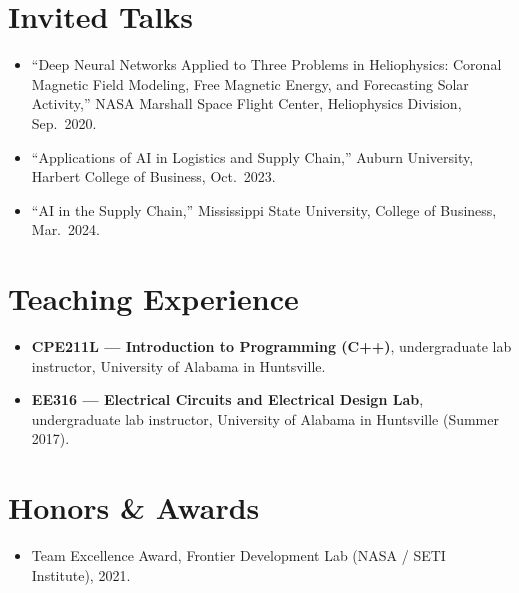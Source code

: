 \documentclass[11pt,letterpaper]{article}
\begin{document}
\section{Invited Talks}
\begin{itemize}
  \item ``Deep Neural Networks Applied to Three Problems in Heliophysics: Coronal Magnetic Field Modeling, Free Magnetic Energy, and Forecasting Solar Activity,'' NASA Marshall Space Flight Center, Heliophysics Division, Sep.~2020.
  \item ``Applications of AI in Logistics and Supply Chain,'' Auburn University, Harbert College of Business, Oct.~2023.
  \item ``AI in the Supply Chain,'' Mississippi State University, College of Business, Mar.~2024.
\end{itemize}

\section{Teaching Experience}
\begin{itemize}
  \item \textbf{CPE211L --- Introduction to Programming (C++)}, undergraduate lab instructor, University of Alabama in Huntsville.
  \item \textbf{EE316 --- Electrical Circuits and Electrical Design Lab}, undergraduate lab instructor, University of Alabama in Huntsville (Summer 2017).
\end{itemize}

\section{Honors \& Awards}
\begin{itemize}
  \item Team Excellence Award, Frontier Development Lab (NASA / SETI Institute), 2021.
\end{itemize}

\end{document}
